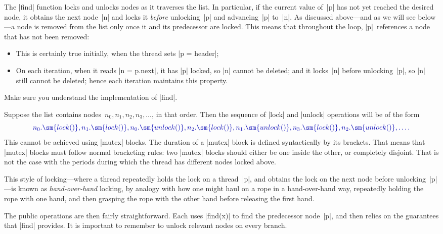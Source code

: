 The |find| function locks and unlocks nodes as it traverses the list.  In
particular, if the current value of~|p| has not yet reached the desired node,
it obtains the next node~|n| and locks it \emph{before} unlocking~|p| and
advancing~|p| to~|n|.  As discussed above---and as we will see below---a node
is removed from the list only once it and its predecessor are locked.  This
means that throughout the loop, |p|~references a node that has not been
removed:
% 
\begin{itemize}
\item This is certainly true initially, when the thread sets |p = header|;

\item On each iteration, when it reads |n = p.next|, it has |p| locked, so |n|
  cannot be deleted; and it locks~|n| before unlocking~|p|, so |n| still
  cannot be deleted; hence each iteration maintains this property.
\end{itemize}

\begin{instruction}
Make sure you understand the implementation of |find|.
\end{instruction}

Suppose the list contains nodes~$n_0, n_1, n_2, n_3, \ldots$, in that order.
Then the sequence of |lock| and |unlock| operations will be of the form
\[\mstyle
n_0.\sm{lock()}, n_1.\sm{lock()}, n_0.\sm{unlock()}, n_2.\sm{lock()},
n_1.\sm{unlock()}, n_3.\sm{lock()}, n_2.\sm{unlock()}, \ldots.
\]
This cannot be achieved using |mutex| blocks.  The duration of a |mutex| block
is defined syntactically by its brackets.  That means that |mutex| blocks must
follow normal bracketing rules: two |mutex| blocks should either be one inside
the other, or completely disjoint.  That is not the case with the periods
during which the thread has different nodes locked above.

This style of locking---where a thread repeatedly holds the lock on a
thread~|p|, and obtains the lock on the next node before unlocking~|p|---is
known as \emph{hand-over-hand} locking, by
analogy with how one might haul on a rope in a hand-over-hand way, repeatedly
holding the rope with one hand, and then grasping the rope with the other hand
before releasing the first hand.

The public operations are then fairly straightforward.  Each uses |find(x)| to
find the predecessor node~|p|, and then relies on the guarantees that |find|
provides.  It is important to remember to unlock relevant nodes on every
branch. 

